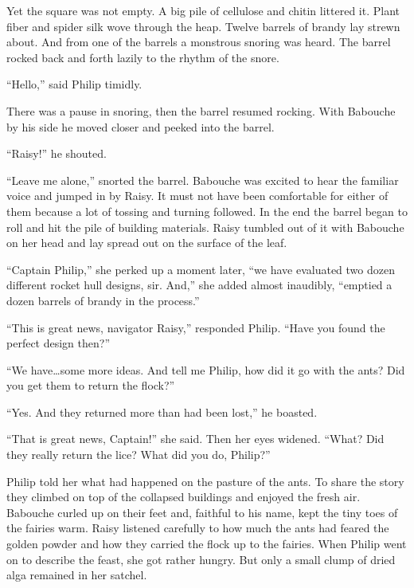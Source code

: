 \documentclass[10pt, draft]{memoir}
\begin{document}
Yet the square was not empty. A big pile of cellulose and chitin littered it.
Plant fiber and spider silk wove through the heap. Twelve barrels of brandy lay
strewn about. And from one of the barrels a monstrous snoring was heard. The
barrel rocked back and forth lazily to the rhythm of the snore.

``Hello,'' said Philip timidly.

There was a pause in snoring, then the barrel resumed rocking. With Babouche by
his side he moved closer and peeked into the barrel.

``Raisy!'' he shouted.

``Leave me alone,'' snorted the barrel. Babouche was excited to hear the
familiar voice and jumped in by Raisy. It must not have been comfortable for
either of them because a lot of tossing and turning followed. In the end the
barrel began to roll and hit the pile of building materials. Raisy tumbled out
of it with Babouche on her head and lay spread out on the surface of the leaf.

``Captain Philip,'' she perked up a moment later, ``we have evaluated two dozen
different rocket hull designs, sir. And,'' she added almost inaudibly,
``emptied a dozen barrels of brandy in the process.''

``This is great news, navigator Raisy,'' responded Philip. ``Have you found the
perfect design then?''

``We have\dots some more ideas. And tell me Philip, how did it go with the
ants? Did you get them to return the flock?''

``Yes. And they returned more than had been lost,'' he boasted.

``That is great news, Captain!'' she said. Then her eyes widened. ``What? Did
they really return the lice? What did you do, Philip?''

Philip told her what had happened on the pasture of the ants. To share the
story they climbed on top of the collapsed buildings and enjoyed the fresh air.
Babouche curled up on their feet and, faithful to his name, kept the tiny toes
of the fairies warm. Raisy listened carefully to how much the ants had feared
the golden powder and how they carried the flock up to the fairies. When Philip
went on to describe the feast, she got rather hungry. But only a small clump of
dried alga remained in her satchel.
\end{document}
